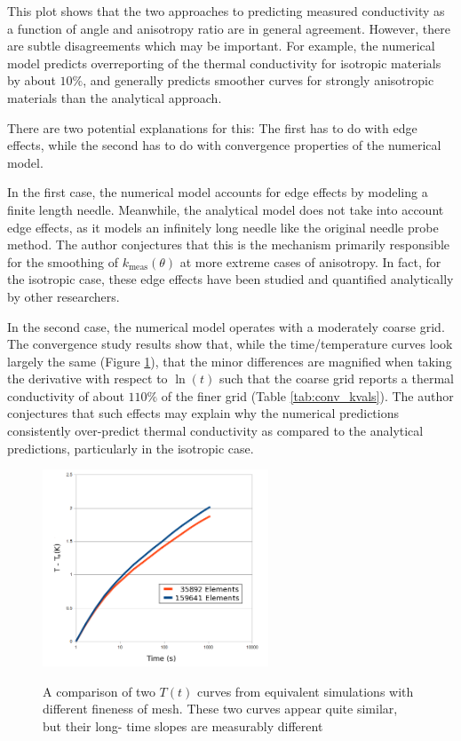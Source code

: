 This plot shows that the two approaches to predicting measured conductivity
as a function of angle and anisotropy ratio are in general agreement. However,
there are subtle disagreements which may be important. For example, the
numerical model predicts overreporting of the thermal conductivity for
isotropic materials by about \(10\%\), and generally predicts smoother
curves for strongly anisotropic materials than the analytical approach.

There are two potential explanations for this: The first has to do with edge
effects, while the second has to do with convergence properties of the numerical
model.

In the first case, the numerical model accounts for edge effects by
modeling a finite length needle. Meanwhile, the analytical model does not take
into account edge effects, as it models an infinitely long needle like the
original needle probe method. The author conjectures that this is the mechanism
primarily responsible for the smoothing of \(k_{\textrm{meas}}(\theta)\) at more extreme
cases of anisotropy. In fact, for the isotropic case, these edge effects have
been studied and quantified analytically by other researchers. \cite{axialerror}


In the second case, the numerical model operates with a moderately coarse grid.
The convergence study results show that, while the time/temperature curves look
largely the same (Figure \ref{fig:conv_curves}), that the minor differences are magnified when taking the
derivative with respect to \(\ln(t)\) such that the coarse grid reports a
thermal conductivity of about \(110\%\) of the finer grid (Table \ref{tab:conv_kvals}). The author
conjectures that such effects may explain why the numerical predictions
consistently over-predict thermal conductivity as compared to the analytical
predictions, particularly in the isotropic case.


\begin{figure}[h]
\centering
\includegraphics[width=0.6\textwidth]{fig/conv_curves.png}
\label{fig:conv_curves}
\caption{A comparison of two \(T(t)\) curves from equivalent simulations with 
different fineness of mesh. These two curves appear quite similar, but their long-
time slopes are measurably different}
\end{figure}


